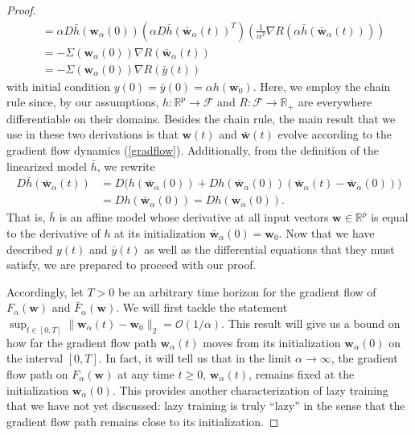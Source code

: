 \documentclass{article}
\begin{document}
\begin{proof}
\begin{align*}
    &= \alpha D\bar{h}(\boldsymbol{w}_{\alpha}(0)) \left( \alpha D\bar{h}(\boldsymbol{\bar{w}}_{\alpha}(t))^T \right)\left( \frac{1}{\alpha^2} \nabla R(\alpha \bar{h}(\boldsymbol{\bar{w}}_{\alpha}(t))) \right)\\
    &= -\Sigma(\boldsymbol{w}_{\alpha}(0))\nabla R(\boldsymbol{\bar{w}}_{\alpha}(t))\\
    &= -\Sigma(\boldsymbol{w}_{\alpha}(0))\nabla R(\bar{y}(t))
\end{align*}
with initial condition $y(0) = \bar{y}(0) = \alpha h(\boldsymbol{w}_0)$. Here, we employ the chain rule since, by our assumptions, $h: \mathbb{R}^p \rightarrow \mathcal{F}$ and $R: \mathcal{F} \rightarrow \mathbb{R}_+$ are everywhere differentiable on their domains. Besides the chain rule, the main result that we use in these two derivations is that $\boldsymbol{w}(t)$ and $\boldsymbol{\bar{w}}(t)$ evolve according to the gradient flow dynamics (\ref{gradflow}). Additionally, from the definition of the linearized model $\bar{h}$, we rewrite
\begin{align*}
  D\bar{h}(\boldsymbol{\bar{w}}_{\alpha}(t)) &= D\bigg( h(\boldsymbol{\bar{w}}_{\alpha}(0)) + Dh(\boldsymbol{\bar{w}}_{\alpha}(0))(\boldsymbol{\bar{w}}_{\alpha}(t) - \boldsymbol{\bar{w}}_{\alpha}(0))  \bigg)\\
  &= Dh(\boldsymbol{\bar{w}}_{\alpha}(0)) = Dh(\boldsymbol{w}_{\alpha}(0)).
\end{align*}
That is, $\bar{h}$ is an affine model whose derivative at all input vectors $\boldsymbol{w} \in \mathbb{R}^p$ is equal to the derivative of $h$ at its initialization $\boldsymbol{\bar{w}}_{\alpha}(0) = \boldsymbol{w}_0$. Now that we have described $y(t)$ and $\bar{y}(t)$ as well as the differential equations that they must satisfy, we are prepared to proceed with our proof.

Accordingly, let $T > 0$ be an arbitrary time horizon for the gradient flow of $F_{\alpha}(\boldsymbol{w})$ and $\bar{F}_{\alpha}(\boldsymbol{w})$. We will first tackle the statement $\sup_{t \in [0, T]} \|\boldsymbol{w}_{\alpha}(t) - \boldsymbol{w}_0 \|_2 = \mathcal{O}(1/\alpha)$. This result will give us a bound on how far the gradient flow path $\boldsymbol{w}_{\alpha}(t)$ moves from its initialization $\boldsymbol{w}_{\alpha}(0)$ on the interval $[0, T]$. In fact, it will tell us that in the limit $\alpha \rightarrow \infty$, the gradient flow path on $F_{\alpha}(\boldsymbol{w})$ at any time $t \geq 0$, $\boldsymbol{w}_{\alpha}(t)$, remains fixed at the initialization $\boldsymbol{w}_{\alpha}(0)$. This provides another characterization of lazy training that we have not yet discussed: lazy training is truly \enquote{lazy} in the sense that the gradient flow path remains close to its initialization.


\end{proof}
\end{document}
